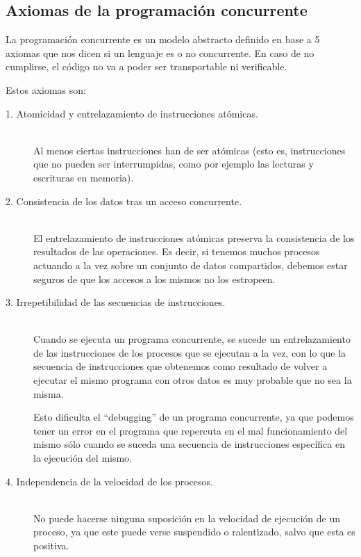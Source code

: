 \subsection{Axiomas de la programación concurrente}
La programación concurrente es un modelo abstracto definido en base a 5 axiomas que nos dicen si un lenguaje es o no concurrente. En caso de no cumplirse, el código no va a poder ser transportable ni verificable.

Estos axiomas son:
\begin{description}
    \item [1. Atomicidad y entrelazamiento de instrucciones atómicas.]~\\
        Al menos ciertas instrucciones han de ser atómicas (esto es, instrucciones que no pueden ser interrumpidas, como por ejemplo las lecturas y escrituras en memoria).
    \item [2. Consistencia de los datos tras un acceso concurrente.]~\\
        El entrelazamiento de instrucciones atómicas preserva la
        consistencia de los resultados de las operaciones. 
        Es decir, si tenemos muchos procesos actuando a la vez sobre un conjunto de datos compartidos, debemos estar seguros de que los accesos a los mismos no los estropeen.
    \item [3. Irrepetibilidad de las secuencias de instrucciones.]~\\
        Cuando se ejecuta un programa concurrente, se sucede un entrelazamiento de las instrucciones de los procesos que se ejecutan a la vez, con lo que la secuencia de instrucciones que obtenemos como resultado de volver a ejecutar el mismo programa con otros datos es muy probable que no sea la misma.

        Esto dificulta el ``debugging'' de un programa concurrente, ya que podemos tener un error en el programa que repercuta en el mal funcionamiento del mismo sólo cuando se suceda una secuencia de instrucciones específica en la ejecución del mismo.
    \item [4. Independencia de la velocidad de los procesos.]~\\
        No puede hacerse ninguna suposición en la velocidad de ejecución de un proceso, ya que este puede verse suspendido o ralentizado, salvo que esta es positiva.


\end{description}
